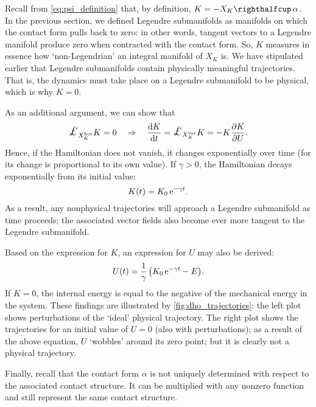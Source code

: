 Recall from \cref{eq:psi_definition} that, by definition, \(K = -\intpr{X_K}{\alpha}\). In the previous section, we defined Legendre submanifolds as manifolds on which the contact form pulls back to zero: in other words, tangent vectors to a Legendre manifold produce zero when contracted with the contact form. So, \(K\) measures in essence how `non-Legendrian' an integral manifold of \(X_K\) is. We have stipulated earlier that Legendre submanifolds contain physically meaningful trajectories. That is, the dynamics must take place on a Legendre submanifold to be physical, which is why \(K = 0\).

As an additional argument, we can show that
\begin{equation}
     \lied{X^{\text{hor}}_K}{K} = 0 \quad \Rightarrow \quad \dv{K}{t} = \lied{X^{\text{ver}}_K}{K} = -K\pdv{K}{U}.
\end{equation}
Hence, if the Hamiltonian does not vanish, it changes exponentially over time (for its change is proportional to its own value). If \(\gamma > 0\), the Hamiltonian decays exponentially from its initial value:
\begin{equation} 
    K(t) = K_0\,\mathrm{e}^{-\gamma t}.
    \label{eq:contact_ham_growth}
\end{equation}
As a result, any nonphysical trajectories will approach a Legendre submanifold as time proceeds; the associated vector fields also become ever more tangent to the Legendre submanifold. 

Based on the expression for \(K\), an expression for \(U\) may also be derived:
\begin{equation}
     U(t) = \frac{1}{\gamma}\,\qty( K_0\,\mathrm{e}^{-\gamma t} - E ).
\end{equation}
If \(K = 0\), the internal energy is equal to the negative of the mechanical energy in the system. These findings are illustrated by \cref{fig:dho_trajectories}: the left plot shows perturbations of the `ideal' physical trajectory. The right plot shows the trajectories for an initial value of \(U = 0\) (also with perturbations); as a result of the above equation, \(U\) `wobbles' around its zero point; but it is clearly not a physical trajectory.

Finally, recall that the contact form \(\alpha\) is not uniquely determined with respect to the associated contact structure. It can be multiplied with any nonzero function and still represent the same contact structure.

